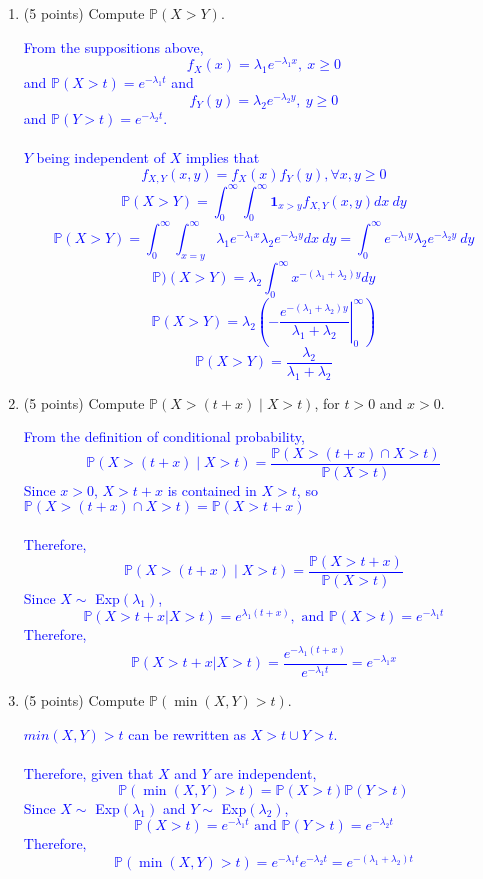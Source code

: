 \documentclass{article}
\begin{document}
\begin{enumerate}[label=(\alph*)]
    \item (5 points) Compute $\mathbb{P}(X > Y)$.

        \textcolor{blue}{From the suppositions above, $$f_X(x)=\lambda_1e^{-\lambda_1x},\ x \geq 0$$ and $\mathbb{P}(X>t)=e^{-\lambda_1t}$ and 
        $$f_Y(y)=\lambda_2e^{-\lambda_2y},\ y \geq 0$$ and $\mathbb{P}(Y>t)=e^{-\lambda_2t}$. \\ \\ 
        $Y$ being independent of $X$ implies that $$f_{X,Y}(x,y)=f_X(x)f_Y(y), \forall x,y \geq 0$$
    $$\mathbb{P}(X>Y)=\int_{0}^{\infty}\int_{0}^{\infty}\mathbf{1}_{x>y}f_{X,Y}(x,y)dx\ dy$$
    $$\mathbb{P}(X>Y)=\int_{0}^{\infty}\int_{x=y}^{\infty}\lambda_1e^{-\lambda_1x}\lambda_2 e^{-\lambda_2 y} dx\ dy= \int_{0}^{\infty}e^{-\lambda_1y}\lambda_2 e^{-\lambda_2 y}\ dy$$
$$\mathbb{P})(X>Y)=\lambda_2 \int_0^{\infty}x^{-(\lambda_1 + \lambda_2)y}dy$$
$$\mathbb{P}(X>Y)=\lambda_2 \left( - \left. \frac{e^{-(\lambda_1 + \lambda_2)y}}{\lambda_1 + \lambda_2}\right|_{0}^{\infty} \right) $$
$$\mathbb{P}(X>Y)=\frac{\lambda_2}{\lambda_1 + \lambda_2}$$}

    \item (5 points) Compute $\mathbb{P}(X > (t + x) \mid X > t)$, for $t > 0$ and $x > 0$.

    \textcolor{blue}{From the definition of conditional probability, $$\mathbb{P}(X > (t + x) \mid X > t)=\frac{\mathbb{P}(X > (t + x) \cap X > t)}{\mathbb{P}(X > t)}$$
        Since $x>0$, ${X>t+x}$ is contained in ${X>t}$, so $\mathbb{P}(X > (t + x) \cap X > t)=\mathbb{P}(X > t + x)$ \\ \\ 
    Therefore, $$\mathbb{P}(X > (t + x) \mid X > t)=\frac{\mathbb{P}(X > t + x)}{\mathbb{P}(X > t)}$$
Since $X \sim $ Exp$(\lambda_1)$, $$\mathbb{P}(X>t+x|X>t)=e^{\lambda_1(t+x)},\text{ and }  \mathbb{P}(X>t)=e^{-\lambda_1t}$$
Therefore, $$\mathbb{P}(X>t+x|X>t)=\frac{e^{-\lambda_1(t+x)}}{e^{-\lambda_1t}}=e^{-\lambda_1x}$$}

    \item (5 points) Compute $\mathbb{P}(\min(X, Y) > t)$.

        \textcolor{blue}{${min(X,Y)>t}$ can be rewritten as ${X>t \cup Y>t}$. \\ \\ Therefore, given that $X$ and $Y$ are independent, $$\mathbb{P}(\min(X,Y)>t)=\mathbb{P}(X>t)\mathbb{P}(Y>t)$$
            Since $X \sim$ Exp$(\lambda_1)$ and $Y \sim$ Exp$(\lambda_2)$, $$\mathbb{P}(X>t)=e^{-\lambda_1t} \text{ and } \mathbb{P}(Y>t)=e^{-\lambda_2t}$$
        Therefore, $$\mathbb{P}(\min(X,Y)>t)=e^{-\lambda_1t}e^{-\lambda_2t}=e^{-(\lambda_1+\lambda_2)t}$$}

\end{enumerate}
\end{document}
